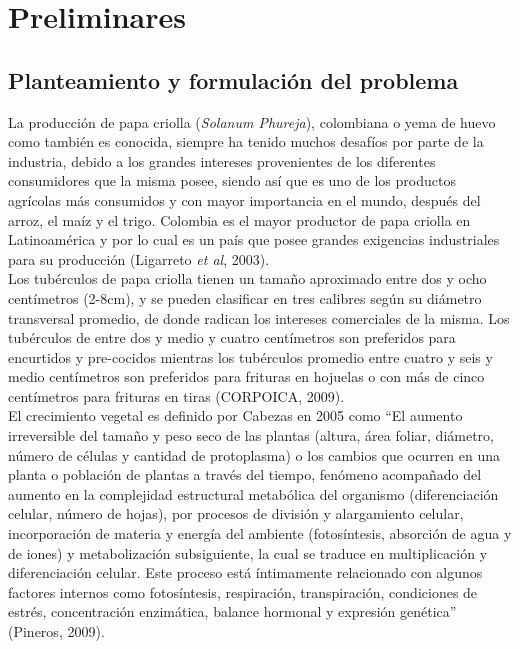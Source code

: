 \chapter{Preliminares}

\section{Planteamiento y formulación del problema}

La producción de papa criolla (\textit{Solanum Phureja}), colombiana o yema de huevo como también es conocida, siempre ha tenido muchos desafíos por parte de la industria, debido a los grandes intereses provenientes de los diferentes consumidores que la misma posee, siendo así que es uno de los productos agrícolas más consumidos y con mayor importancia en el mundo, después del arroz, el maíz y el trigo. Colombia es el mayor productor de papa criolla en Latinoamérica y por lo cual es un país que posee grandes exigencias industriales para su producción (Ligarreto \textit{et al}, 2003).\\

Los tubérculos de papa criolla tienen un tamaño aproximado entre dos y ocho centímetros (2-8cm), y se pueden clasificar en tres calibres según su diámetro transversal promedio,  de donde radican los intereses comerciales de la misma. Los tubérculos de entre dos y medio y cuatro centímetros son preferidos para encurtidos y pre-cocidos mientras los tubérculos promedio entre cuatro y seis y medio centímetros son preferidos para frituras en hojuelas o con más de cinco centímetros para frituras en tiras (CORPOICA, 2009).\\

El crecimiento vegetal es definido por Cabezas en 2005 como "`El aumento irreversible del tamaño y peso seco de las plantas (altura, área foliar, diámetro, número de células y cantidad de protoplasma) o los cambios que ocurren en una planta o población de plantas a través del tiempo, fenómeno acompañado del aumento en la complejidad estructural metabólica del organismo (diferenciación celular, número de hojas), por procesos de división y alargamiento celular, incorporación de materia y energía del ambiente (fotosíntesis, absorción de agua y de iones) y metabolización subsiguiente, la cual se traduce en multiplicación y diferenciación celular. Este proceso está íntimamente relacionado con algunos factores internos como fotosíntesis, respiración, transpiración, condiciones de estrés, concentración enzimática, balance hormonal y expresión genética"' (Pineros, 2009).\\

